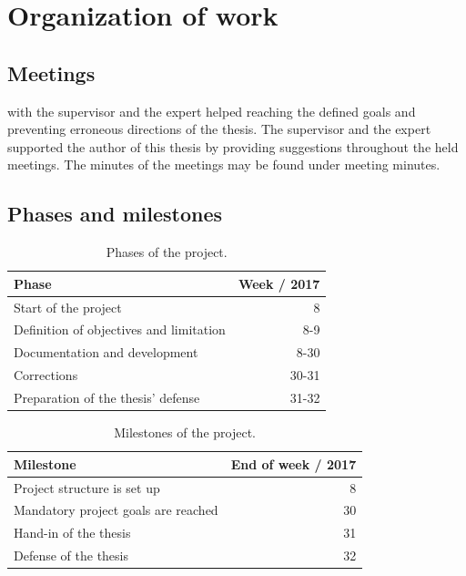 \documentclass[%
    a4paper,    %
    justified,  %
    nobib,      %
    openany     %
]{tufte-book}
\begin{document}
\section{Organization of work}
\label{sec:organization-of-work}

\subsection{Meetings}
\label{subsec:meetings}

 with the supervisor and the expert helped reaching
the defined goals and preventing erroneous directions of the thesis. The
supervisor and the expert supported the author of this thesis by providing
suggestions throughout the held meetings. The minutes of the meetings may be
found under meeting minutes. 

\subsection{Phases and milestones}
\label{subsec:project-phases-milestones}

\begin{table}[h]
  \caption{Phases of the project.}
  \begin{tabularx}{\textwidth}{Xr}
    \toprule
    \textbf{Phase}   & \textbf{Week / 2017} \\
    \midrule
    Start of the project & 8 \\
    Definition of objectives and limitation & 8-9 \\
    Documentation and development & 8-30 \\
    Corrections & 30-31 \\
    Preparation of the thesis' defense & 31-32 \\
    \bottomrule
  \end{tabularx}
\end{table}

\begin{table}[h]
  \caption{Milestones of the project.}
  \begin{tabularx}{\textwidth}{Xr}
    \toprule
    \textbf{Milestone}   & \textbf{End of week / 2017} \\
    \midrule
    Project structure is set up & 8 \\
    Mandatory project goals are reached & 30 \\
    Hand-in of the thesis & 31 \\
    Defense of the thesis & 32 \\
    \bottomrule
  \end{tabularx}
\end{table}
\end{document}
